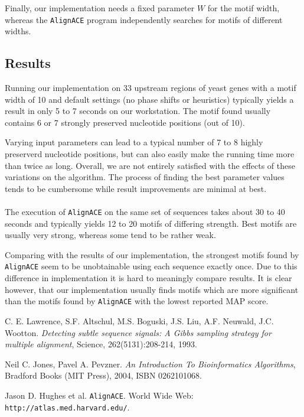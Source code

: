 \documentclass[a4paper,11pt]{article}
\begin{document}
Finally, our implementation needs a fixed parameter $W$ for the motif width,
whereas the \texttt{AlignACE} program independently searches for motifs of
different widths.


\subsection*{Results}

Running our implementation on 33 upstream  regions of yeast genes with a motif
width of 10 and default settings (no phase shifts or heuristics) typically
yields a result in only 5 to 7 seconds on our workstation. The motif found
usually contains 6 or 7 strongly preserved nucleotide positions (out of 10).

Varying input parameters can lead to a typical number of 7 to 8 highly
preserverd nucleotide positions, but can also easily make the running time
more than twice as long. Overall, we are not entirely satisfied with the
effects of these variations on the algorithm. The process of finding the best
parameter values tends to be cumbersome while result improvements are minimal
at best.

\paragraph{}

The execution of \texttt{AlignACE} on the same set of sequences takes about
30 to 40 seconds and typically yields 12 to 20 motifs of differing strength.
Best motifs are usually very strong, whereas some tend to be rather weak.

Comparing with the results of our implementation, the strongest motifs found
by \texttt{AlignACE} seem to be unobtainable using each sequence exactly once.
Due to this difference in implementation it is hard to meaningly compare
results. It is clear however, that our implementation usually finds motifs
which are more significant than the motifs found by \texttt{AlignACE} with the
lowest reported MAP score.


\begin{thebibliography}{99}

C. E. Lawrence, S.F. Altschul, M.S. Boguski, J.S. Liu,
A.F. Neuwald, J.C. Wootton. \emph{Detecting subtle sequence signals: A Gibbs
sampling strategy for multiple alignment}, Science, 262(5131):208-214, 1993.

Neil C. Jones, Pavel A. Pevzner. \emph{An Introduction To
Bioinformatics Algorithms}, Bradford Books (MIT Press), 2004, ISBN 0262101068.

Jason D. Hughes et al. \texttt{AlignACE}.
World Wide Web: \texttt{http://atlas.med.harvard.edu/}.

\end{thebibliography}
\end{document}
